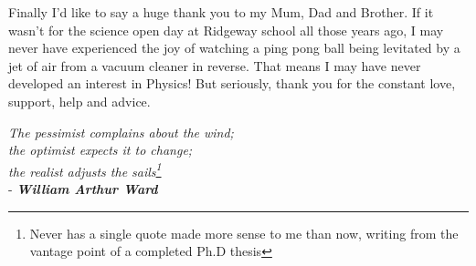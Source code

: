 Finally I'd like to say a huge thank you to my Mum, Dad and Brother. If it wasn't for the science open day at Ridgeway school all those years ago, I may never have experienced the joy of watching a ping pong ball being levitated by a jet of air from a vacuum cleaner in reverse. That means I may have never developed an interest in Physics! But seriously, thank you for the constant love, support, help and advice.


\newpage \vspace*{8cm}
\begin{center} 
\begin{flushleft}
\textit{The pessimist complains about the wind;\\
the optimist expects it to change;\\
the realist adjusts the sails\footnote{Never has a single quote made more sense to me than now, writing from the vantage point of a completed Ph.D thesis}\\}
\indent - \textit{\textbf{William Arthur Ward}}
\end{flushleft}
\end{center} 





